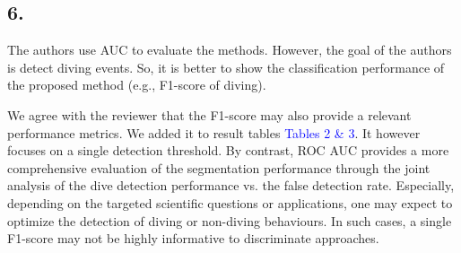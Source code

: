 \documentclass{ar2rc}
\begin{document}
\subsection*{6.}

\RC The authors use AUC to evaluate the methods. However, the goal of the authors is detect diving events. So, it is better to show the classification performance of the proposed method (e.g., F1-score of diving).

\AR We agree with the reviewer that the F1-score may also provide a relevant performance metrics. We added it to result tables \textcolor{blue}{Tables 2 \& 3}. It however focuses on a single detection threshold. By contrast, ROC AUC provides a more comprehensive evaluation of the segmentation performance through the joint analysis of the dive detection performance vs. the false detection rate. Especially, depending on the targeted scientific questions or applications, one may expect to optimize the detection of diving or non-diving behaviours. In such cases, a single F1-score may not be highly informative to discriminate approaches.
\end{document}
